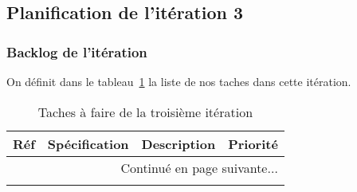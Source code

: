 \subsection{Planification de l'itération 3}

\subsubsection{Backlog de l'itération}


On définit dans le tableau~\ref{tab:sprint3-backlog} la liste de nos taches dans cette itération.

\begin{center}
    \footnotesize
    \begin{longtable}{| p{1cm} | p{5cm} | p{7cm} | p{1cm} |}
        \caption{Taches à faire de la troisième itération}
        \label{tab:sprint3-backlog} \\

 \hline
 \multicolumn{1}{|c}{\textbf{Réf}} &
 \multicolumn{1}{|c}{\textbf{Spécification}} &
 \multicolumn{1}{|c}{\textbf{Description}} &
 \multicolumn{1}{|c|}{\textbf{Priorité}} \\ \hline
 \endhead

 \hline \multicolumn{4}{|r|}{{Continué en page suivante$\dotsc$}} \\ \hline
 \endfoot

 \hline \hline
 \endlastfoot


\end{longtable}
\end{center}
